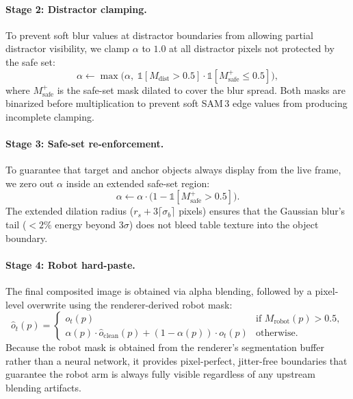 \paragraph{Stage 2: Distractor clamping.}
To prevent soft blur values at distractor boundaries from allowing partial distractor visibility, we clamp $\alpha$ to $1.0$ at all distractor pixels not protected by the safe set:
\begin{equation}
    \alpha \leftarrow \max\bigl(\alpha,\; \mathbb{1}[M_{\text{dist}} > 0.5] \cdot \mathbb{1}[M_{\text{safe}}^{+} \leq 0.5]\bigr),
    \label{eq:mechanism2}
\end{equation}
where $M_{\text{safe}}^{+}$ is the safe-set mask dilated to cover the blur spread. Both masks are binarized before multiplication to prevent soft SAM\,3 edge values from producing incomplete clamping.

\paragraph{Stage 3: Safe-set re-enforcement.}
To guarantee that target and anchor objects always display from the live frame, we zero out $\alpha$ inside an extended safe-set region:
\begin{equation}
    \alpha \leftarrow \alpha \cdot \bigl(1 - \mathbb{1}[M_{\text{safe}}^{+} > 0.5]\bigr).
    \label{eq:reinforce}
\end{equation}
The extended dilation radius ($r_s + 3\lceil\sigma_b\rceil$ pixels) ensures that the Gaussian blur's tail ($<2\%$ energy beyond $3\sigma$) does not bleed table texture into the object boundary.

\paragraph{Stage 4: Robot hard-paste.}
The final composited image is obtained via alpha blending, followed by a pixel-level overwrite using the renderer-derived robot mask:
\begin{equation}
    \hat{o}_t(p) = \begin{cases}
        o_t(p) & \text{if } M_{\text{robot}}(p) > 0.5, \\
        \alpha(p) \cdot \hat{o}_{\text{clean}}(p) + (1-\alpha(p)) \cdot o_t(p) & \text{otherwise}.
    \end{cases}
    \label{eq:composite}
\end{equation}
Because the robot mask is obtained from the renderer's segmentation buffer rather than a neural network, it provides pixel-perfect, jitter-free boundaries that guarantee the robot arm is always fully visible regardless of any upstream blending artifacts.


